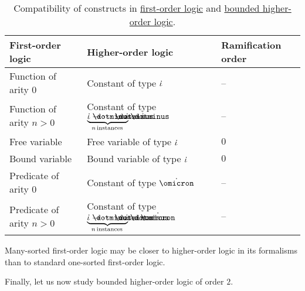 \begin{example}
\begin{thmenum}
    \begin{table}
      \begin{center}
        \begin{tabular}{l l l}
          \toprule
          First-order logic              & Higher-order logic                                                                                                                 & Ramification order \\
          \midrule
          Function of arity \( 0 \)      & Constant of type \( \dot{\iota} \)                                                                                                   & --      \\
          Function of arity \( n > 0 \)  & Constant of type \( \underbrace{\syn\iota \synimplies \cdots \synimplies \syn\iota}_{n \T*{instances}} \synimplies \syn\iota \)    & --      \\
          Free variable                  & Free variable of type \( \dot{\iota} \)                                                                                              & \( 0 \) \\
          Bound variable                 & Bound variable of type \( \dot{\iota} \)                                                                                             & \( 0 \) \\
          Predicate of arity \( 0 \)     & Constant of type \( \syn\omicron \)                                                                                                & --      \\
          Predicate of arity \( n > 0 \) & Constant of type \( \underbrace{\syn\iota \synimplies \cdots \synimplies \syn\iota}_{n \T*{instances}} \synimplies \syn\omicron \) & --      \\
          \bottomrule
        \end{tabular}
      \end{center}

      \caption{Compatibility of constructs in \hyperref[def:first_order_logic]{first-order logic} and \hyperref[def:bounded_hol]{bounded higher-order logic}.}\label{tab:ex:def:bounded_hol/first}
    \end{table}

    Many-sorted first-order logic may be closer to higher-order logic in its formalisms than to standard one-sorted first-order logic.

     Finally, let us now study bounded higher-order logic of order \( 2 \).


\end{thmenum}
\end{example}
